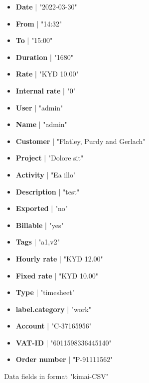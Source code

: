 \documentclass[journal]{IEEEtran}
\begin{document}
\begin{figure}[h]

	\begin{itemize}
	
		\item \textbf{Date} | "2022-03-30"

		\item \textbf{From} | "14:32"

		\item \textbf{To} | "15:00"

		\item \textbf{Duration} | "1680"

		\item \textbf{Rate} | "KYD 10.00"

		\item \textbf{Internal rate} | "0"

		\item \textbf{User} | "admin"

		\item \textbf{Name} | "admin"

		\item \textbf{Customer} | "Flatley, Purdy and Gerlach"

		\item \textbf{Project} | "Dolore sit"

		\item \textbf{Activity} | "Ea illo"

		\item \textbf{Description} | "test"

		\item \textbf{Exported} | "no"

		\item \textbf{Billable} | "yes"

		\item \textbf{Tags} | "a1,v2"

		\item \textbf{Hourly rate} | "KYD 12.00"

		\item \textbf{Fixed rate} | "KYD 10.00"

		\item \textbf{Type} | "timesheet"

		\item \textbf{label.category} | "work"

		\item \textbf{Account} | "C-37165956"

		\item \textbf{VAT-ID} | "6011598336445140"

		\item \textbf{Order number} | "P-91111562"
	\end{itemize}
	\caption{Data fields in format "kimai-CSV"}
	\label{list:FORMAT2}

\end{figure}
\end{document}

